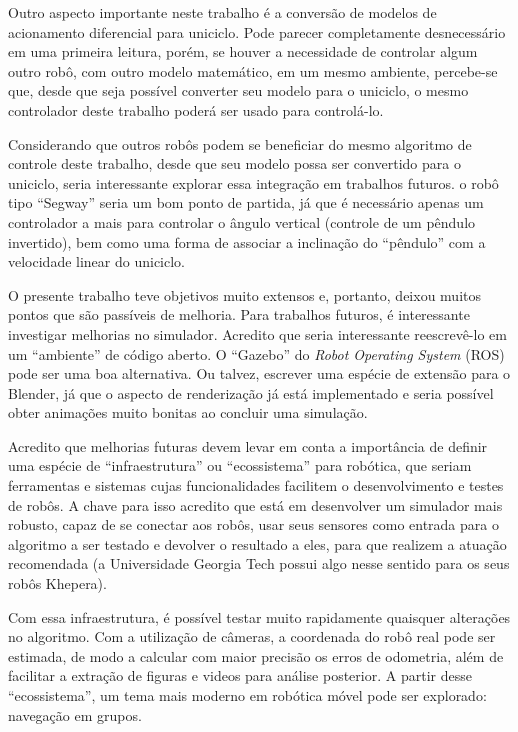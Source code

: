 Outro aspecto importante neste trabalho é a conversão de modelos de acionamento diferencial para uniciclo. Pode 
parecer completamente desnecessário em uma primeira leitura, porém, se houver a necessidade de controlar algum outro 
robô, com outro modelo matemático, em um mesmo ambiente, percebe-se que, desde que seja possível converter seu modelo 
para o uniciclo, o mesmo controlador deste trabalho poderá ser usado para controlá-lo.  
 
Considerando que outros robôs podem se beneficiar do mesmo algoritmo de controle deste trabalho, desde que 
seu modelo possa ser convertido para o uniciclo, seria interessante explorar essa integração em trabalhos futuros.
o robô tipo ``Segway'' seria um bom ponto de partida, já que é necessário apenas um controlador a mais para controlar
o ângulo vertical (controle de um pêndulo invertido), bem como uma forma de associar a inclinação do ``pêndulo'' com 
a velocidade linear do uniciclo.

O presente trabalho teve objetivos muito extensos e, portanto, deixou muitos pontos que são passíveis de melhoria.
Para trabalhos futuros, é interessante investigar melhorias no simulador. Acredito que seria interessante reescrevê-lo
em um ``ambiente'' de código aberto. O ``Gazebo'' do \textit{Robot Operating System} (ROS) pode ser uma boa 
alternativa. Ou talvez, escrever uma espécie de extensão para o Blender, já que o aspecto de renderização já está
implementado e seria possível obter animações muito bonitas ao concluir uma simulação.  

Acredito que melhorias futuras devem levar em conta a importância de definir uma espécie de 
``infraestrutura'' ou ``ecossistema'' para robótica, que seriam ferramentas e sistemas cujas
funcionalidades facilitem o desenvolvimento e testes de robôs. A chave para isso acredito que 
está em desenvolver um simulador mais robusto, capaz de se conectar aos robôs, usar seus
sensores como entrada para o algoritmo a ser testado e devolver o resultado a eles, para que
realizem a atuação recomendada (a Universidade Georgia Tech possui algo nesse sentido para 
os seus robôs Khepera). 

Com essa infraestrutura, é possível testar muito rapidamente quaisquer alterações no algoritmo.
Com a utilização de câmeras, a coordenada do robô real pode ser estimada, de modo a
calcular com maior precisão os erros de odometria, além de facilitar a extração de figuras e
videos para análise posterior. A partir desse ``ecossistema'', um tema mais moderno em robótica 
móvel pode ser explorado: navegação em grupos. 

